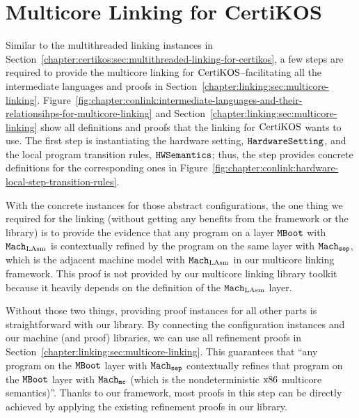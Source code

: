 \section{Multicore Linking for CertiKOS}
\label{chapter:certikos:sec:multicore-linking-for-certikos}


Similar to the multithreaded linking instances in Section~\ref{chapter:certikos:sec:multithreaded-linking-for-certikos}, a few steps are required  to provide the multicore linking for $\mathrm{CertiKOS}$--facilitating all the intermediate languages
and proofs in Section~\ref{chapter:linking:sec:multicore-linking}.
Figure~\ref{fig:chapter:conlink:intermediate-languages-and-their-relationsihps-for-multicore-linking} and 
Section~\ref{chapter:linking:sec:multicore-linking} show all definitions and 
proofs that the linking for $\mathrm{CertiKOS}$ wants to use. 
The first step is instantiating the hardware setting, ${{\mathrm{\texttt{HardwareSetting}}}}$, and the local program transition rules, ${{\mathrm{\texttt{HWSemantics}}}}$;
thus, the step provides concrete definitions for the corresponding ones  
 in Figure~\ref{fig:chapter:conlink:hardware-local-step-transition-rules}.

With the concrete instances for those abstract configurations, 
the one thing  we required for the linking (without getting any benefits from the framework or the library)
is to provide the evidence that any program on a layer ${\mathrm{\texttt{MBoot}}}$  with ${\mathrm{\texttt{Mach}}}_{\mathrm{LAsm}}$ is contextually refined by the program on the same layer with ${{{\mathrm{\texttt{Mach}}}}_{{\mathrm{\texttt{sep}}}}}$, which is the adjacent machine model with ${\mathrm{\texttt{Mach}}}_{\mathrm{LAsm}}$ in our multicore linking framework. This proof is not provided by our multicore linking library toolkit because it heavily depends on the definition of the ${\mathrm{\texttt{Mach}}}_{\mathrm{LAsm}}$ layer.

Without those two things, providing proof instances for all other parts is straightforward with our library. 
By connecting the configuration instances and our machine (and proof) libraries, 
we can use all refinement proofs in Section~\ref{chapter:linking:sec:multicore-linking}. 
This guarantees that ``any program on the ${\mathrm{\texttt{MBoot}}}$ layer with ${{{\mathrm{\texttt{Mach}}}}_{{\mathrm{\texttt{sep}}}}}$ contextually refines that program on the ${\mathrm{\texttt{MBoot}}}$ layer with ${{{{\mathrm{\texttt{Mach}}}}_{\mathrm{\texttt{mc}}}}}$ (which is the nondeterministic $\mathrm{x86}$ multicore semantics)''.
Thanks to our framework, most proofs in this step can be directly achieved by applying the existing refinement proofs in our library.
%
